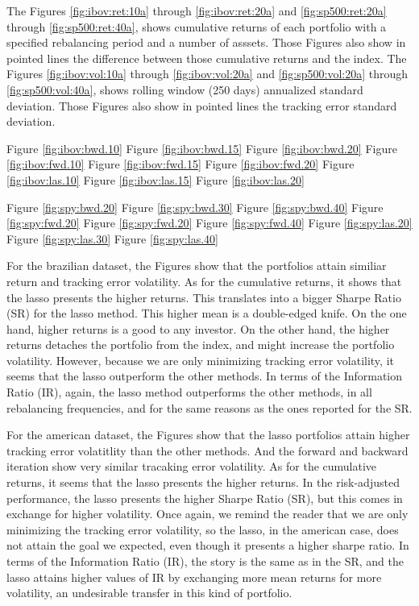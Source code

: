 \documentclass[preprint, doubleblind, authoryear,10pt]{elsarticle}
\begin{document}
The Figures \ref{fig:ibov:ret:10a} through \ref{fig:ibov:ret:20a} and \ref{fig:sp500:ret:20a} through \ref{fig:sp500:ret:40a}, shows cumulative returns of each portfolio with a specified rebalancing period and a number of asssets.
Those Figures also show in pointed lines the difference between those cumulative returns and the index.
The Figures \ref{fig:ibov:vol:10a} through \ref{fig:ibov:vol:20a} and \ref{fig:sp500:vol:20a} through \ref{fig:sp500:vol:40a}, shows rolling window (250 days) annualized standard deviation.
Those Figures also show in pointed lines the tracking error standard deviation.



Figure \ref{fig:ibov:bwd.10}
Figure \ref{fig:ibov:bwd.15}
Figure \ref{fig:ibov:bwd.20}
Figure \ref{fig:ibov:fwd.10}
Figure \ref{fig:ibov:fwd.15}
Figure \ref{fig:ibov:fwd.20}
Figure \ref{fig:ibov:las.10}
Figure \ref{fig:ibov:las.15}
Figure \ref{fig:ibov:las.20}

Figure \ref{fig:spy:bwd.20}
Figure \ref{fig:spy:bwd.30}
Figure \ref{fig:spy:bwd.40}
Figure \ref{fig:spy:fwd.20}
Figure \ref{fig:spy:fwd.20}
Figure \ref{fig:spy:fwd.40}
Figure \ref{fig:spy:las.20}
Figure \ref{fig:spy:las.30}
Figure \ref{fig:spy:las.40}


For the brazilian dataset, the Figures show that the portfolios attain similiar return and tracking error volatility.
As for the cumulative returns, it shows that the lasso presents the higher returns.
This translates into a bigger Sharpe Ratio (SR) for the lasso method.
This higher mean is a double-edged knife.
On the one hand, higher returns is a good to any investor.
On the other hand, the higher returns detaches the portfolio from the index, and might increase the portfolio volatility.
However, because we are only minimizing tracking error volatility, it seems that the lasso outperform the other methods.
In terms of the Information Ratio (IR), again, the lasso method outperforms the other methods, in all rebalancing frequencies, and for the same reasons as the ones reported for the SR.

For the american dataset, the Figures show that the lasso portfolios attain higher tracking error volatitlity than the other methods.
And the forward and backward iteration show very similar tracaking error volatility.
As for the cumulative returns, it seems that the lasso presents the higher returns.
In the risk-adjusted performance, the lasso presents the higher Sharpe Ratio (SR), but this comes in exchange for higher volatility.
Once again, we remind the reader that we are only minimizing the tracking error volatility, so the lasso, in the american case, does not attain the goal we expected, even though it presents a higher sharpe ratio.
In terms of the Information Ratio (IR), the story is the same as in the SR, and the lasso attains higher values of IR by exchanging more mean returns for more volatility, an undesirable transfer in this kind of portfolio.
\end{document}
